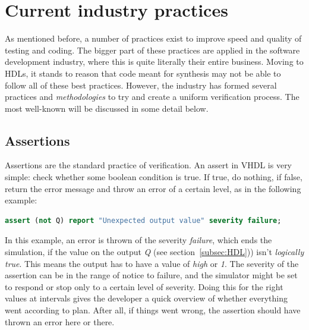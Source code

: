 \documentclass[11pt,british]{article}
\begin{document}
\newpage

\section{Current industry practices}
\label{sec:industry}
As mentioned before, a number of practices exist to improve speed and quality of testing and coding. The bigger part of these practices are applied in the software development industry, where this is quite literally their entire business. Moving to \gls{HDL}s, it stands to reason that code meant for synthesis may not be able to follow all of these best practices. However, the industry has formed several practices and \emph{methodologies} to try and create a uniform verification process. The most well-known will be discussed in some detail below.

\subsection{Assertions}
\label{subsec:assertions}
Assertions are the standard practice of verification. An assert in VHDL is very simple: check whether some boolean condition is true. If true, do nothing, if false, return the error message and throw an error of a certain level, as in the following example:
\begin{lstlisting}[language=VHDL, tabsize=4, frame=single, framesep=3mm, belowskip=8pt, aboveskip=8pt, showstringspaces=false, basicstyle=\small, linewidth=\textwidth]
assert (not Q) report "Unexpected output value" severity failure;
\end{lstlisting}
In this example, an error is thrown of the severity \emph{failure}, which ends the simulation, if the value on the output \emph{Q} (see section~\ref{subsec:HDL})) isn't \emph{logically true}. This means the output has to have a value of \emph{high} or \emph{1}. The severity of the assertion can be in the range of notice to failure, and the simulator might be set to respond or stop only to a certain level of severity. Doing this for the right values at intervals gives the developer a quick overview of whether everything went according to plan. After all, if things went wrong, the assertion should have thrown an error here or there.
\end{document}
